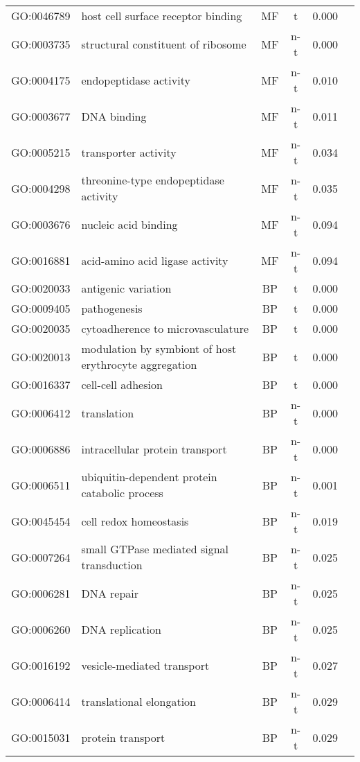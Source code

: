 \documentclass{article}
\begin{document}
\begin{table}
\begin{center}
\begin{tabular}{llcccc}
GO:0046789 & host cell surface receptor binding & MF & t & 0.000\\
GO:0003735 & structural constituent of ribosome & MF & n-t & 0.000\\
GO:0004175 & endopeptidase activity & MF & n-t & 0.010\\
GO:0003677 & DNA binding & MF & n-t & 0.011\\
GO:0005215 & transporter activity & MF & n-t & 0.034\\
GO:0004298 & threonine-type endopeptidase activity & MF & n-t & 0.035\\
GO:0003676 & nucleic acid binding & MF & n-t & 0.094\\
GO:0016881 & acid-amino acid ligase activity & MF & n-t & 0.094\\
GO:0020033 & antigenic variation & BP & t & 0.000\\
GO:0009405 & pathogenesis & BP & t & 0.000\\
GO:0020035 & cytoadherence to microvasculature& BP & t & 0.000\\
GO:0020013 & modulation by symbiont of host erythrocyte aggregation & BP & t & 0.000\\
GO:0016337 & cell-cell adhesion & BP & t & 0.000\\
GO:0006412 & translation & BP & n-t & 0.000\\
GO:0006886 & intracellular protein transport & BP & n-t & 0.000\\
GO:0006511 & ubiquitin-dependent protein catabolic process & BP & n-t & 0.001\\
GO:0045454 & cell redox homeostasis & BP & n-t & 0.019\\
GO:0007264 & small GTPase mediated signal transduction & BP & n-t & 0.025\\
GO:0006281 & DNA repair & BP & n-t & 0.025\\
GO:0006260 & DNA replication & BP & n-t & 0.025\\
GO:0016192 & vesicle-mediated transport & BP & n-t & 0.027\\
GO:0006414 & translational elongation & BP & n-t & 0.029\\
GO:0015031 & protein transport & BP & n-t & 0.029\\
\hline
\end{tabular}
\end{center}
\label{table:RingsFirstPro}
\end{table}
\clearpage
\end{document}
